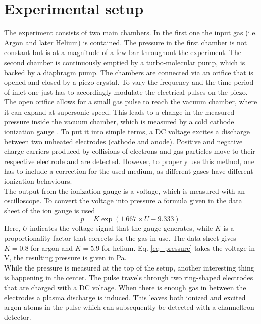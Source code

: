 \documentclass[a4paper,10pt]{article}
\begin{document}
\section{Experimental setup}
The experiment consists of two main chambers. In the first one the input gas (i.e. Argon and later Helium) is contained. The pressure in the first chamber is not constant but is at a magnitude of a few \si{\bar} throughout the experiment. The second chamber is continuously emptied by a turbo-molecular pump, which is backed by a diaphragm pump. The chambers are connected via an orifice that is opened and closed by a piezo crystal. To vary the frequency and the time period of inlet one just has to accordingly modulate the electrical pulses on the piezo.
\newline
The open orifice allows for a small gas pulse to reach the vacuum chamber, where it can expand at supersonic speed. This leads to a change in the measured pressure inside the vacuum chamber, which is measured by a cold cathode ionization gauge \cite{cold_cathode}. To put it into simple terms, a DC voltage excites a discharge between two unheated electrodes (cathode and anode). Positive and negative charge carriers produced by collisions of electrons and gas particles move to their respective electrode and are detected. However, to properly use this method, one has to include a correction for the used medium, as different gases have different ionization behaviours.
\\
The output from the ionization gauge is a voltage, which is measured with an oscilloscope. To convert the voltage into pressure a formula given in the data sheet of the ion gauge \cite{datasheet_pfeiffer} is used
\begin{equation}
	\label{eq_pressure}
	p = K \exp(1.667 \times U - 9.333).
\end{equation}
Here, $U$ indicates the voltage signal that the gauge generates, while $K$ is a proportionality factor that corrects for the gas in use. The data sheet gives $K= 0.8$ for argon and $K = 5.9$ for helium. Eq. \ref{eq_pressure} takes the voltage in \si{\volt}, the resulting pressure is given in \si{\pascal}.
\\
While the pressure is measured at the top of the setup, another interesting thing is happening in the center. The pulse travels through two ring-shaped electrodes that are charged with a DC voltage. When there is enough gas in between the electrodes a plasma discharge is induced. This leaves both ionized and excited argon atoms in the pulse which can subsequently be detected with a channeltron detector.\\
\end{document}
